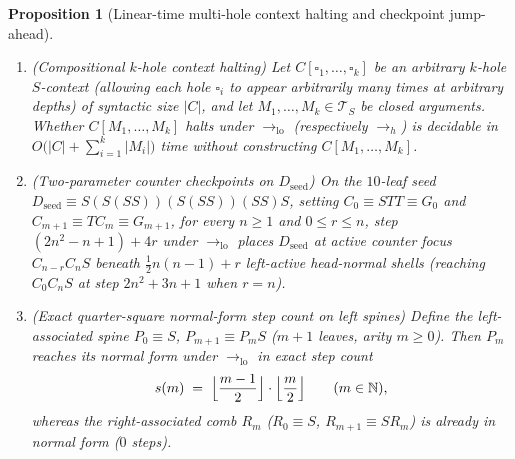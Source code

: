 \documentclass[11pt,reqno]{amsart}
\numberwithin{equation}{section}
\theoremstyle{plain}
\newtheorem{proposition}[theorem]{Proposition}
\theoremstyle{definition}
\theoremstyle{remark}
\newcommand{\TS}{\mathcal{T}_S}
\begin{document}
\begin{proposition}[Linear-time multi-hole context halting and checkpoint jump-ahead]
\label{prop:jump-ahead}
\begin{enumerate}[label=(\roman*),leftmargin=2.2em]
\item \emph{(Compositional $k$-hole context halting)} Let $C[\square_1, \dots, \square_k]$ be an arbitrary $k$-hole $S$-context (allowing each hole $\square_i$ to appear arbitrarily many times at arbitrary depths) of syntactic size $|C|$, and let $M_1, \dots, M_k \in \TS$ be closed arguments. Whether $C[M_1, \dots, M_k]$ halts under $\to_{\mathrm{lo}}$ (respectively $\to_h$) is decidable in $O\bigl(|C| + \sum_{i=1}^k |M_i|\bigr)$ time without constructing $C[M_1, \dots, M_k]$.
\item \emph{(Two-parameter counter checkpoints on $D_{\mathrm{seed}}$)} On the $10$-leaf seed $D_{\mathrm{seed}} \equiv S(S(S S))(S(S S))(S S)S$, setting $C_0 \equiv S T T \equiv G_0$ and $C_{m+1} \equiv T C_m \equiv G_{m+1}$, for every $n \ge 1$ and $0 \le r \le n$, step $(2n^2 - n + 1) + 4r$ under $\to_{\mathrm{lo}}$ places $D_{\mathrm{seed}}$ at active counter focus $C_{n-r} C_n S$ beneath $\frac{1}{2}n(n-1) + r$ left-active head-normal shells (reaching $C_0 C_n S$ at step $2n^2 + 3n + 1$ when $r = n$).
\item \emph{(Exact quarter-square normal-form step count on left spines)} Define the left-associated spine $P_0 \equiv S$, $P_{m+1} \equiv P_m S$ ($m + 1$ leaves, arity $m \ge 0$). Then $P_m$ reaches its normal form under $\to_{\mathrm{lo}}$ in exact step count
\begin{equation}
\label{eq:sprefix-quarter-square}
s(m) \;=\; \Bigl\lfloor \frac{m-1}{2} \Bigr\rfloor \cdot \Bigl\lfloor \frac{m}{2} \Bigr\rfloor
\qquad (m \in \mathbb{N}),
\end{equation}
whereas the right-associated comb $R_m$ ($R_0 \equiv S$, $R_{m+1} \equiv S R_m$) is already in normal form ($0$ steps).
\end{enumerate}
\end{proposition}
\end{document}
